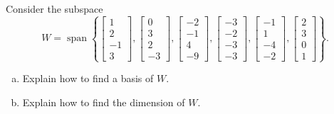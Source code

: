
\begin{exerciseStatement}


Consider the subspace \[W=\operatorname{span}  \left\{ \left[\begin{array}{c}
1 \\
2 \\
-1 \\
3
\end{array}\right] , \left[\begin{array}{c}
0 \\
3 \\
2 \\
-3
\end{array}\right] , \left[\begin{array}{c}
-2 \\
-1 \\
4 \\
-9
\end{array}\right] , \left[\begin{array}{c}
-3 \\
-2 \\
-3 \\
-3
\end{array}\right] , \left[\begin{array}{c}
-1 \\
1 \\
-4 \\
-2
\end{array}\right] , \left[\begin{array}{c}
2 \\
3 \\
0 \\
1
\end{array}\right] \right\} .\]


\begin{enumerate}[(a)]
\item  Explain how to find a basis of \(W\).
\item  Explain how to find the dimension of \(W\).
\end{enumerate}
    
\end{exerciseStatement}
    
